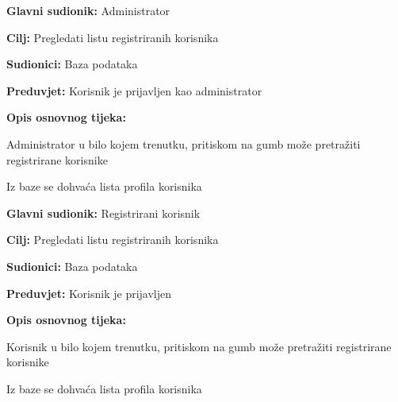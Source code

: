 \begin{packed_item}
	
	\item \textbf{Glavni sudionik: }Administrator
	\item  \textbf{Cilj:} Pregledati listu registriranih korisnika
	\item  \textbf{Sudionici:} Baza podataka
	\item  \textbf{Preduvjet:} Korisnik je prijavljen kao administrator
	\item  \textbf{Opis osnovnog tijeka:}
	
	\item[] \begin{packed_enum}
		
		\item Administrator u bilo kojem trenutku, pritiskom na gumb može pretražiti registrirane korisnike
		\item Iz baze se dohvaća lista profila korisnika
	\end{packed_enum}
\end{packed_item}

\noindent {}
\begin{packed_item}
	
	\item \textbf{Glavni sudionik: }Registrirani korisnik
	\item  \textbf{Cilj:} Pregledati listu registriranih korisnika
	\item  \textbf{Sudionici:} Baza podataka
	\item  \textbf{Preduvjet:} Korisnik je prijavljen
	\item  \textbf{Opis osnovnog tijeka:}
	
	\item[] \begin{packed_enum}
		
		\item Korisnik u bilo kojem trenutku, pritiskom na gumb može pretražiti registrirane korisnike
		\item Iz baze se dohvaća lista profila korisnika
	\end{packed_enum}
\end{packed_item}

